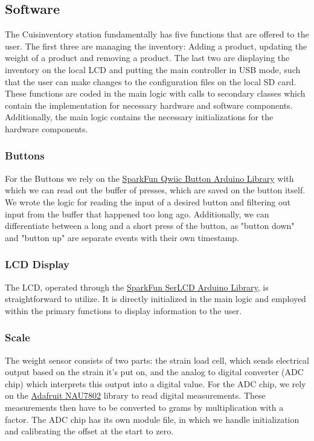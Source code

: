 \documentclass{article}
\begin{document}
\subsection{Software}
The Cuisinventory station fundamentally has five functions that are offered to the user. The first three are managing the inventory: Adding a product, updating the weight of a product and removing a product.
The last two are displaying the inventory on the local LCD and putting the main controller in USB mode, such that the user can make changes to the configuration files on the local SD card.
These functions are coded in the main logic with calls to secondary classes which contain the implementation for necessary hardware and software components.
Additionally, the main logic contains the necessary initializations for the hardware components.
\subsubsection{Buttons}
For the Buttons we rely on the \href{https://github.com/sparkfun/SparkFun_Qwiic_Button_Arduino_Library}{SparkFun Qwiic Button Arduino Library} with which we can read out the buffer of presses, which are saved on the button itself.
We wrote the logic for reading the input of a desired button and filtering out input from the buffer that happened too long ago.
Additionally, we can differentiate between a long and a short press of the button, as "button down" and "button up" are separate events with their own timestamp.

\subsubsection{LCD Display}
The LCD, operated through the \href{https://github.com/sparkfun/SparkFun_SerLCD_Arduino_Library}{SparkFun SerLCD Arduino Library}, is straightforward to utilize. It is directly initialized in the main logic and employed within the primary functions to display information to the user.

\subsubsection{Scale}
The weight sensor consists of two parts: the strain load cell, which sends electrical output based on the strain it's put on, and the analog to digital converter (ADC chip) which interprets this output into a digital value.
For the ADC chip, we rely on the \href{https://github.com/adafruit/Adafruit_NAU7802}{Adafruit NAU7802} library to read digital measurements.
These measurements then have to be converted to grams by multiplication with a factor.
The ADC chip has its own module file, in which we handle initialization and calibrating the offset at the start to zero.
\end{document}
